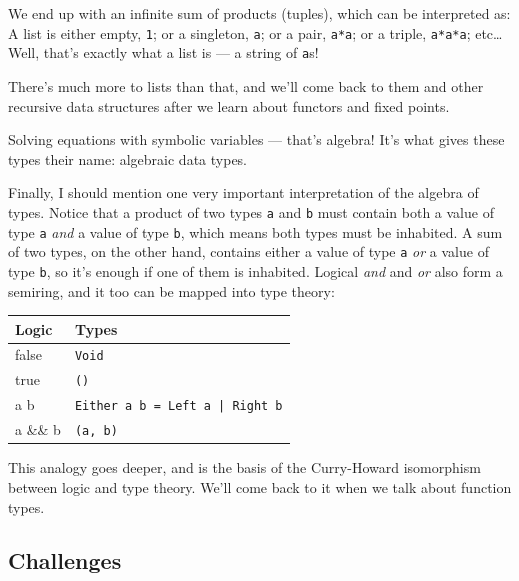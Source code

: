 \noindent
We end up with an infinite sum of products (tuples), which can be
interpreted as: A list is either empty, \texttt{1}; or a singleton,
\texttt{a}; or a pair, \texttt{a*a}; or a triple, \texttt{a*a*a};
etc\ldots{} Well, that's exactly what a list is --- a string of
\texttt{a}s!

There's much more to lists than that, and we'll come back to them and
other recursive data structures after we learn about functors and fixed
points.

Solving equations with symbolic variables --- that's algebra! It's what
gives these types their name: algebraic data types.

Finally, I should mention one very important interpretation of the
algebra of types. Notice that a product of two types \texttt{a} and
\texttt{b} must contain both a value of type \texttt{a} \emph{and} a
value of type \texttt{b}, which means both types must be inhabited. A
sum of two types, on the other hand, contains either a value of type
\texttt{a} \emph{or} a value of type \texttt{b}, so it's enough if one
of them is inhabited. Logical \emph{and} and \emph{or} also form a
semiring, and it too can be mapped into type theory:

\begin{longtable}[]{@{}ll@{}}
\toprule
Logic & Types\tabularnewline
\midrule
\endhead
false & \texttt{Void}\tabularnewline
true & \texttt{()}\tabularnewline
a \textbar{}\textbar{} b &
\texttt{Either a b = Left a | Right b}\tabularnewline
a \&\& b & \texttt{(a, b)}\tabularnewline
\bottomrule
\end{longtable}

\noindent
This analogy goes deeper, and is the basis of the Curry-Howard
isomorphism between logic and type theory. We'll come back to it when we
talk about function types.

\subsection{Challenges}\label{challenges}

